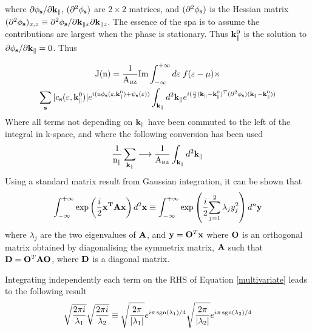 \documentclass[a4paper, 12pt]{article}
\begin{document}
where $\partial \phi_{\bf s}/\partial{\bf k}_\parallel,\,(\partial^2\phi_{\bf s})$ are $2\times2$ matrices, and $(\partial^2 \phi_{\bf s})$ is the Hessian matrix $(\partial^2\phi_{\bf s})_{x, z} \equiv \partial^2\phi_{\bf s}/\partial{\rm \bf k_{\parallel \mathnormal x}}\partial{\rm \bf k_{\parallel \mathnormal z}}$. The essence of the \acrfull{spa} is to assume the contributions are largest when the phase is stationary. Thus ${\bf k}_\parallel^0$ is the solution to ${\partial \phi_{\bf s}}/{\partial{\bf k}_\parallel } = 0$. Thus

\begin{multline}\label{stationary}
	{\rm J(n) = \frac{1}{\rm A_{\scriptscriptstyle BZ}}Im}\int_{-\infty}^{+\infty}d\varepsilon\;f(\varepsilon - \mu)\times \\ \sum_{\bf s}{|c_{\bf s}(\varepsilon,{\bf k}_\parallel^0)| e^{i{\rm (n} \phi_{\bf s}(\varepsilon, {\bf k}_\parallel^0)+ \psi_{\bf s}(\varepsilon))}}\int_{\bf k_\parallel}d^2 {\bf k}_\parallel \mathnormal e^{i(\frac{\rm n}{2}({\bf k}_\parallel - {\bf k}_\parallel^0)^T(\partial^2\phi_{\bf s}) ({\bf k}_\parallel - {\bf k}_\parallel^0))}
\end{multline}
Where all terms not depending on $\bf k_\parallel$ have been commuted to the left of the integral in k-space, and where the following conversion has been used
\begin{equation}
	\frac{1}{\rm n_\parallel}\sum_{\bf k_\parallel} \longrightarrow \frac{1}{\rm A_{\scriptscriptstyle BZ}} \int_{\bf k_\parallel}d^2 \bf k_\parallel
\end{equation}	
Using a standard matrix result from Gaussian integration{}, it can be shown that
\begin{equation}\label{multivariate}
	\int_{-\infty}^{+\infty} \exp\left(\frac{i}{2}{\bf x^TAx}\right)d^2{\bf x}\equiv\int_{-\infty}^{+\infty} \exp\left(\frac{i}{2}{\sum_{j=1}^2 \lambda_j y_j^2}\right)d^n{\bf y}
\end{equation}
where $\lambda_j$ are the two eigenvalues of $\bf A$, and ${\bf y} = {\bf O}^T \bf x$ where $\bf O$ is an orthogonal matrix obtained by diagonalising the symmetrix matrix, $\bf A$ such that ${\bf D} = {\bf O}^T \bf AO$, where $\bf D$ is a diagonal matrix.
\\\par Integrating independently each term on the RHS of Equation \eqref{multivariate} leads to the following result
\begin{equation}\label{sqrts}
	\sqrt{\frac{2\pi i}{\lambda_1}}\sqrt{\frac{2\pi i}{\lambda_2}}\equiv\sqrt{\frac{2\pi}{|\lambda_1|}}e^{i\pi\, {\rm sgn}(\lambda_1)/4}\sqrt{\frac{2\pi}{|\lambda_2|}} e^{i\pi \,{\rm sgn}(\lambda_2)/4}
\end{equation}
\end{document}
